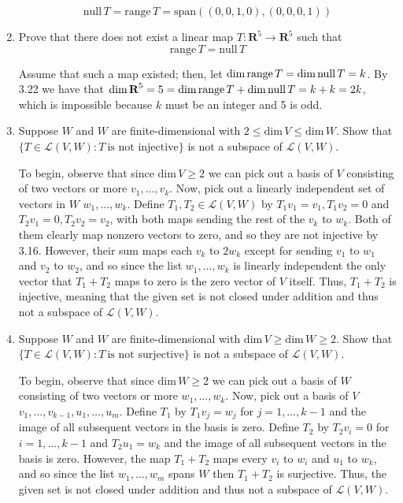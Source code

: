 \documentclass{book}
\begin{document}
\begin{enumerate}
\begin{equation}
    \text{null} \, T = \text{range} \, T = \text{span}((0,0,1,0),(0,0,0,1))
\end{equation}

\item Prove that there does not exist a linear map \(T:\textbf{R}^5 \rightarrow \textbf{R}^5\) such that \[\textrm{range} \, T=\textrm{null} \, T\]

Assume that such a map existed; then, let \(\textrm{dim\,range} \, T=\textrm{dim\,null} \, T=k\).  By 3.22 we have that \(\textrm{dim} \, \textbf{R}^5=5=\textrm{dim\,range} \, T+\textrm{dim\,null} \, T=k+k=2k\), which is impossible because \(k\) must be an integer and 5 is odd.

\item Suppose \(W\) and \(W\) are finite-dimensional with \(2 \leq \textrm{dim} \, V \leq \textrm{dim} \, W\).  Show that \(\{T \in \mathcal{L}(V,W): T \ \textrm{is not injective}\}\) is not a subspace of \(\mathcal{L}(V,W)\).

To begin, observe that since \(\textrm{dim} \, V \geq 2\) we can pick out a basis of \(V\) consisting of two vectors or more \(v_1,\dots,v_k\).  Now, pick out a linearly independent set of vectors in \(W\) \(w_1,\dots,w_k\).  Define \(T_1,T_2 \in \mathcal{L}(V,W)\) by \(T_1v_1=v_1, T_1v_2=0\) and \(T_2v_1=0, T_2v_2=v_2\), with both maps sending the rest of the \(v_k\) to \(w_k\).  Both of them clearly map nonzero vectors to zero, and so they are not injective by 3.16.  However, their sum maps each \(v_k\) to \(2w_k\) except for sending \(v_1\) to \(w_1\) and \(v_2\) to \(w_2\), and so since the list \(w_1,\dots,w_k\) is linearly independent the only vector that \(T_1+T_2\) maps to zero is the zero vector of \(V\) itself.  Thus, \(T_1+T_2\) is injective, meaning that the given set is not closed under addition and thus not a subspace of \(\mathcal{L}(V,W)\).

\item Suppose \(W\) and \(W\) are finite-dimensional with \(\textrm{dim} \, V \geq \textrm{dim} \, W \geq 2\).  Show that \(\{T \in \mathcal{L}(V,W): T \ \textrm{is not surjective}\}\) is not a subspace of \(\mathcal{L}(V,W)\).

To begin, observe that since \(\textrm{dim} \, W \geq 2\) we can pick out a basis of \(W\) consisting of two vectors or more \(w_1,\dots,w_k\).  Now, pick out a basis of \(V\) \(v_1,\dots,v_{k-1},u_1,\dots,u_m\).  Define \(T_1\) by \(T_1v_j=w_j\) for \(j=1,\dots,k-1\) and the image of all subsequent vectors in the basis is zero.  Define \(T_2\) by \(T_2v_i=0\) for \(i=1,\dots,k-1\) and \(T_2u_1=w_k\) and the image of all subsequent vectors in the basis is zero.  However, the map \(T_1+T_2\) maps every \(v_i\) to \(w_i\) and \(u_1\) to \(w_k\), and so since the list \(w_1,\dots,w_m\) spans \(W\) then \(T_1+T_2\) is surjective.  Thus, the given set is not closed under addition and thus not a subspace of \(\mathcal{L}(V,W)\).


\end{enumerate}
\end{document}

